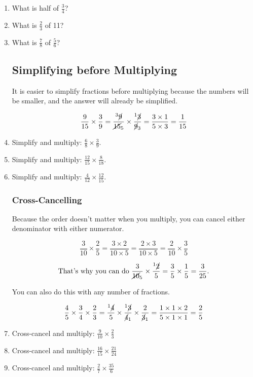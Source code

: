 \documentclass[14pt]{article}
\begin{document}
\begin{enumerate}
\item What is half of $\frac{3}{4}$?
\item What is $\frac{2}{3}$ of 11?
\item What is $\frac{7}{8}$ of $\frac{5}{6}$?

\subsection*{Simplifying before Multiplying}
It is easier to simplify fractions before multiplying because the numbers will be smaller, and the answer will already be simplified.

$$\frac{9}{15} \times \frac{3}{9} =
\frac{{^3\cancel{9}}}{{\cancel{15}_5}} \times \frac{{^1\cancel{3}}}{{\cancel{9}_3}} = \frac{3\times1}{5\times3} = \frac{1}{15}$$

\item Simplify and multiply: $\frac{6}{8}\times\frac{3}{9}.$
\item Simplify and multiply: $\frac{12}{15}\times\frac{8}{18}.$
\item Simplify and multiply: $\frac{4}{12}\times\frac{12}{15}.$

\subsubsection*{Cross-Cancelling}
Because the order doesn't matter when you multiply, you can cancel either denominator with either numerator.

$$\frac{3}{10} \times \frac{2}{5} = \frac{{3 \times 2}}{{10 \times 5}} = \frac{{2 \times 3}}{{10 \times 5}} = \frac{2}{10} \times \frac{3}{5}$$

$$\text{That's why you can do }\frac{3}{{\cancel{10}_5}} \times \frac{{^1\cancel{2}}}{5} = \frac{3}{5} \times \frac{1}{5} = \frac{3}{25}\text{.}$$

You can also do this with any number of fractions.

$$\frac{4}{5} \times \frac{3}{4} \times \frac{2}{3} = \frac{{^1\cancel{4}}}{5} \times \frac{{^1\cancel{3}}}{{\cancel{4}_1}} \times \frac{2}{{\cancel{3}_1}} = \frac{1 \times 1 \times2}{5 \times 1 \times 1} = \frac{2}{5}$$

\item Cross-cancel and multiply: $\frac{9}{10} \times \frac{2}{3}$
\item Cross-cancel and multiply: $\frac{16}{15} \times \frac{21}{24}$
\item Cross-cancel and multiply: $\frac{2}{7} \times \frac{35}{6}$


\end{enumerate}
\end{document}
